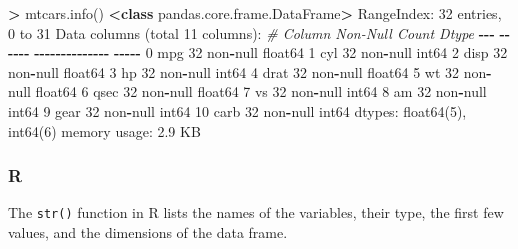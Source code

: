 \documentclass[
]{book}
\newenvironment{Shaded}{\begin{snugshade}}{\end{snugshade}}
\newcommand{\CommentTok}[1]{\textcolor[rgb]{0.56,0.35,0.01}{\textit{#1}}}
\newcommand{\DecValTok}[1]{\textcolor[rgb]{0.00,0.00,0.81}{#1}}
\newcommand{\FloatTok}[1]{\textcolor[rgb]{0.00,0.00,0.81}{#1}}
\newcommand{\KeywordTok}[1]{\textcolor[rgb]{0.13,0.29,0.53}{\textbf{#1}}}
\newcommand{\NormalTok}[1]{#1}
\newcommand{\OperatorTok}[1]{\textcolor[rgb]{0.81,0.36,0.00}{\textbf{#1}}}
\newcommand{\StringTok}[1]{\textcolor[rgb]{0.31,0.60,0.02}{#1}}
\begin{document}
\begin{Shaded}
\begin{Highlighting}[]
\OperatorTok{\textgreater{}}\NormalTok{ mtcars.info()}
\OperatorTok{\textless{}}\KeywordTok{class} \StringTok{\textquotesingle{}pandas.core.frame.DataFrame\textquotesingle{}}\OperatorTok{\textgreater{}}
\NormalTok{RangeIndex: }\DecValTok{32}\NormalTok{ entries, }\DecValTok{0}\NormalTok{ to }\DecValTok{31}
\NormalTok{Data columns (total }\DecValTok{11}\NormalTok{ columns):}
 \CommentTok{\#   Column  Non{-}Null Count  Dtype  }
\OperatorTok{{-}{-}{-}}  \OperatorTok{{-}{-}{-}{-}{-}{-}}  \OperatorTok{{-}{-}{-}{-}{-}{-}{-}{-}{-}{-}{-}{-}{-}{-}}  \OperatorTok{{-}{-}{-}{-}{-}}  
 \DecValTok{0}\NormalTok{   mpg     }\DecValTok{32}\NormalTok{ non}\OperatorTok{{-}}\NormalTok{null     float64}
 \DecValTok{1}\NormalTok{   cyl     }\DecValTok{32}\NormalTok{ non}\OperatorTok{{-}}\NormalTok{null     int64  }
 \DecValTok{2}\NormalTok{   disp    }\DecValTok{32}\NormalTok{ non}\OperatorTok{{-}}\NormalTok{null     float64}
 \DecValTok{3}\NormalTok{   hp      }\DecValTok{32}\NormalTok{ non}\OperatorTok{{-}}\NormalTok{null     int64  }
 \DecValTok{4}\NormalTok{   drat    }\DecValTok{32}\NormalTok{ non}\OperatorTok{{-}}\NormalTok{null     float64}
 \DecValTok{5}\NormalTok{   wt      }\DecValTok{32}\NormalTok{ non}\OperatorTok{{-}}\NormalTok{null     float64}
 \DecValTok{6}\NormalTok{   qsec    }\DecValTok{32}\NormalTok{ non}\OperatorTok{{-}}\NormalTok{null     float64}
 \DecValTok{7}\NormalTok{   vs      }\DecValTok{32}\NormalTok{ non}\OperatorTok{{-}}\NormalTok{null     int64  }
 \DecValTok{8}\NormalTok{   am      }\DecValTok{32}\NormalTok{ non}\OperatorTok{{-}}\NormalTok{null     int64  }
 \DecValTok{9}\NormalTok{   gear    }\DecValTok{32}\NormalTok{ non}\OperatorTok{{-}}\NormalTok{null     int64  }
 \DecValTok{10}\NormalTok{  carb    }\DecValTok{32}\NormalTok{ non}\OperatorTok{{-}}\NormalTok{null     int64  }
\NormalTok{dtypes: float64(}\DecValTok{5}\NormalTok{), int64(}\DecValTok{6}\NormalTok{)}
\NormalTok{memory usage: }\FloatTok{2.9}\NormalTok{ KB}
\end{Highlighting}
\end{Shaded}

\hypertarget{r-14}{%
\subsubsection*{R}\label{r-14}}

The \texttt{str()} function in R lists the names of the variables, their type, the first few values, and the dimensions of the data frame.
\end{document}
